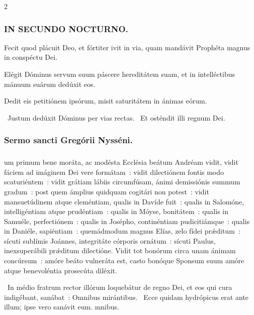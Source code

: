 \documentclass[9pt,twoside]{extarticle}
\begin{document}
\begin{multicols}{2}
{\subsubsection*{\center \textsc{IN SECUNDO NOCTURNO.}}
\begin{tightlist}{}
\item {} Fecit quod plácuit Deo, et fórtiter ivit in via, quam mandávit Prophéta magnus in conspéctu Dei.
\item {} Elégit Dóminus servum suum páscere hereditátem suam, et in intelléctibus mánuum suárum dedúxit eos.
\item {} Dedit eis petitiónem ipsórum, misit saturitátem in ánimas eórum.
\item {}~Justum dedúxit Dóminus per vias rectas. ~Et osténdit illi regnum Dei.
\end{tightlist}

\subsubsection*{\center Sermo sancti Gregórii Nysséni.}
\subsubsection*{\center {}}
um primum bene moráta, ac modésta Ecclésia beátum Andréam vidit, vidit fáciem ad imáginem Dei vere formátam~: vidit dilectiónem fontis modo scaturiéntem~: vidit grátiam lábiis circumfúsam, ánimi demissiónis summum gradum~: post quem ámplius quidquam cogitári non potest~: vidit mansuetúdinem atque cleméntiam, qualis in Davíde fuit~: qualis in Salomóne, intelligéntiam atque prudéntiam~: qualis in Móyse, bonitátem~: qualis in Samuéle, perfectiónem~: qualis in Josépho, continéntiam pudicitiámque~: qualis in Daniéle, sapiéntiam~: quemádmodum magnus Elías, zelo fídei prǽditum~: sícuti sublímis Joánnes, integritáte córporis ornátum~: sícuti Paulus, inexsuperábili prǽditum dilectióne. Vidit tot bonórum circa unam ánimam concúrsum~: amóre beáto vulneráta est, casto bonóque Sponsum suum amóre atque benevoléntia prosecúta diléxit.

\begin{tightlist}{}
\item {}~In médio fratrum rector illórum loquebátur de regno Dei, et eos qui cura indigébant, sanábat~: \textred{*} Omnibus mirántibus. ~Ecce quidam hydrópicus erat ante illum; ipse vero sanávit eum. mnibus.
\end{tightlist}

}
\end{multicols}
\end{document}
